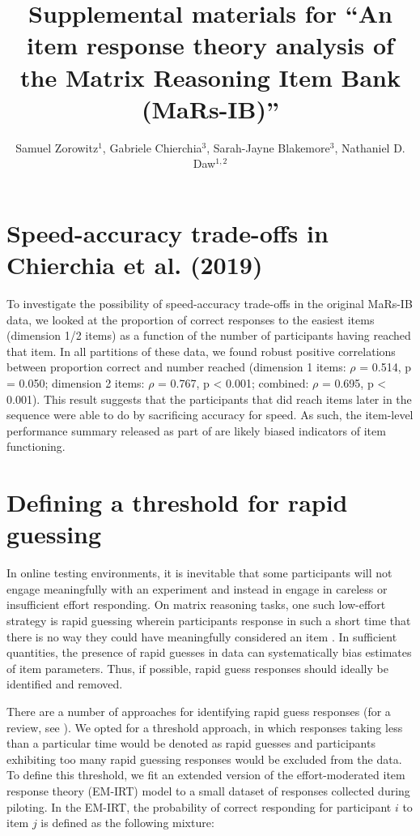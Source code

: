 \documentclass[a4paper,man,natbib]{apa6}
\title{Supplemental materials for ``An item response theory analysis of the Matrix Reasoning Item Bank (MaRs-IB)''}
\author{Samuel Zorowitz$^1$, Gabriele Chierchia$^3$, Sarah-Jayne Blakemore$^3$, Nathaniel D. Daw$^{1,2}$}
\affiliation{$^1$Princeton Neuroscience Institute, Princeton University, USA\\$^2$Department of Psychology, Princeton University, USA\\$^3$Department of Psychology, University of Cambridge, Downing Street, Cambridge, UK}
\begin{document}
\maketitle

\section*{Speed-accuracy trade-offs in Chierchia et al. (2019)}

To investigate the possibility of speed-accuracy trade-offs in the original MaRs-IB data, we looked at the proportion of correct responses to the easiest items (dimension 1/2 items) as a function of the number of participants having reached that item. In all partitions of these data, we found robust positive correlations between proportion correct and number reached (dimension 1 items: $\rho$ = 0.514, p = 0.050; dimension 2 items: $\rho$ = 0.767, p < 0.001; combined: $\rho$ = 0.695, p < 0.001). This result suggests that the participants that did reach items later in the sequence were able to do by sacrificing accuracy for speed. As such, the item-level performance summary released as part of \cite{chierchia2019matrix} are likely biased indicators of item functioning.

\section{Defining a threshold for rapid guessing}

In online testing environments, it is inevitable that some participants will not engage meaningfully with an experiment and instead in engage in careless or insufficient effort responding. On matrix reasoning tasks, one such low-effort strategy is rapid guessing wherein participants response in such a short time that there is no way they could have meaningfully considered an item \citep{wise2017rapid}. In sufficient quantities, the presence of rapid guesses in data can systematically bias estimates of item parameters. Thus, if possible, rapid guess responses should ideally be identified and removed. 

There are a number of approaches for identifying rapid guess responses (for a review, see \cite{wise2017rapid}). We opted for a threshold approach, in which responses taking less than a particular time would be denoted as rapid guesses and participants exhibiting too many rapid guessing responses would be excluded from the data. To define this threshold, we fit an extended version of the effort-moderated item response theory (EM-IRT) model \citep{wise2006application} to a small dataset of responses collected during piloting. In the EM-IRT, the probability of correct responding for participant $i$ to item $j$ is defined as the following mixture:
\end{document}
